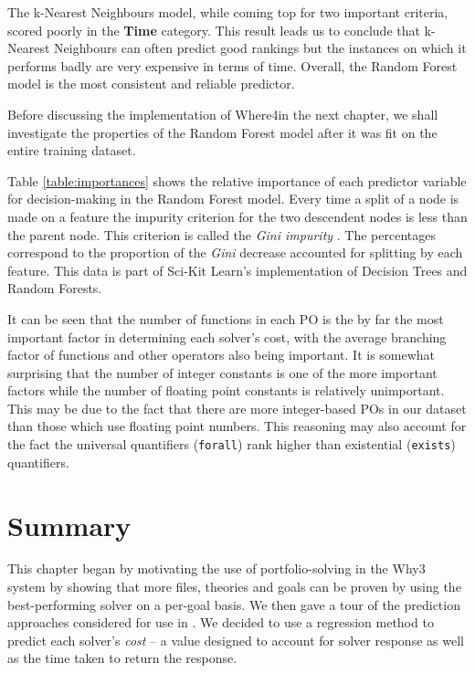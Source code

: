 The k-Nearest Neighbours model, while coming top for two important criteria, scored poorly in the \textbf{Time} category.
This result leads us to conclude that k-Nearest Neighbours can often predict good rankings but the instances on which it performs badly are very expensive in terms of time.
Overall, the Random Forest model is the most consistent and reliable predictor.

Before discussing the implementation of \textsf{Where4}in the next chapter, we shall investigate the properties of the Random Forest model after it was fit on the entire training dataset.

Table \ref{table:importances} shows the relative importance of each predictor variable for decision-making in the Random Forest model. 
Every time a split of a node is made on a feature the impurity criterion for the two descendent nodes is less than the parent node. 
This criterion is called the \textit{Gini impurity} \cite{RandomForests}. 
The percentages correspond to the proportion of the \textit{Gini} decrease accounted for splitting by each feature.
This data is part of Sci-Kit Learn's implementation of Decision Trees and Random Forests. 

It can be seen that the number of functions in each PO is the by far the most important factor in determining each solver's cost, with the average branching factor of functions and other operators also being important.
It is somewhat surprising that the number of integer constants is one of the more important factors while the number of floating point constants is relatively unimportant.
This may be due to the fact that there are more integer-based POs in our dataset than those which use floating point numbers.
This reasoning may also account for the fact the universal quantifiers (\texttt{forall}) rank higher than existential (\texttt{exists}) quantifiers.



\section{Summary}

This chapter began by motivating the use of portfolio-solving in the \textsf{Why3} system by showing that more files, theories and goals can be proven by using the best-performing solver on a per-goal basis.
We then gave a tour of the prediction approaches considered for use in \where.
We decided to use a regression method to predict each solver's \textit{cost} -- a value designed to account for solver response as well as the time taken to return the response. 

